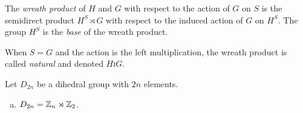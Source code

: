 \begin{defn}
    The \textsl{wreath product} of\/ $H$ and\/ $G$ with respect to the action of\/ $G$ on\/ $S$ is the semidirect product\/ $H^S\rtimes G$ with respect to the induced action of\/ $G$ on\/ $H^S$. The group $H^S$ is the \textsl{base} of the wreath product.

    When\/ $S=G$ and the action is the left multiplication, the wreath product is called \textsl{natural} and denoted\/ $H\wr G$.
\end{defn}

\begin{xmpl}
    Let $D_{2n}$ be a dihedral group with $2n$ elements.
    \begin{enumerate}[a),font=\upshape]
        \item $D_{2n}=\mathbb{Z}_n\rtimes\mathbb{Z}_2$. 
        

\end{enumerate}
\end{xmpl}
